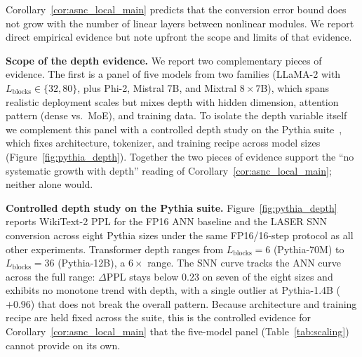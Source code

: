 \documentclass{article}
\theoremstyle{plain}
\theoremstyle{definition}
\theoremstyle{remark}
\begin{document}
Corollary~\ref{cor:asnc_local_main} predicts that the conversion error bound
does not grow with the number of linear layers between nonlinear modules. We
report direct empirical evidence but note upfront the scope and limits of
that evidence.

\noindent\textbf{Scope of the depth evidence.}
We report two complementary pieces of evidence. The first is a panel of five
models from two families (LLaMA-2 with $L_{\mathrm{blocks}} \in \{32, 80\}$,
plus Phi-2, Mistral 7B, and Mixtral $8\!\times\!7$B), which spans realistic
deployment scales but mixes depth with hidden dimension, attention pattern
(dense vs.\ MoE), and training data. To isolate the depth variable itself we
complement this panel with a controlled depth study on the Pythia
suite~\citep{biderman2023pythia}, which fixes architecture, tokenizer, and
training recipe across model sizes (Figure~\ref{fig:pythia_depth}). Together
the two pieces of evidence support the ``no systematic growth with depth''
reading of Corollary~\ref{cor:asnc_local_main}; neither alone would.

\noindent\textbf{Controlled depth study on the Pythia suite.}
Figure~\ref{fig:pythia_depth} reports WikiText-2 PPL for the FP16 ANN
baseline and the LASER SNN conversion across eight Pythia sizes under the
same FP16/16-step protocol as all other experiments. Transformer depth
ranges from $L_{\mathrm{blocks}} = 6$ (Pythia-70M) to
$L_{\mathrm{blocks}} = 36$ (Pythia-12B), a $6\times$ range. The SNN curve
tracks the ANN curve across the full range: $\Delta$PPL stays below $0.23$
on seven of the eight sizes and exhibits no monotone trend with depth, with
a single outlier at Pythia-1.4B ($+0.96$) that does not break the overall
pattern. Because architecture and training recipe are held fixed across the
suite, this is the controlled evidence for
Corollary~\ref{cor:asnc_local_main} that the five-model panel
(Table~\ref{tab:scaling}) cannot provide on its own.
\end{document}
